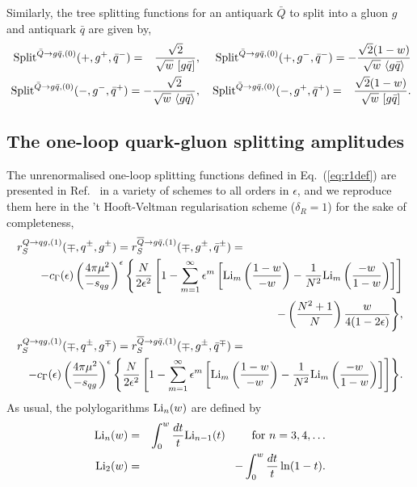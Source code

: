 \documentclass[paper,notoc,nohyper]{JHEP3}
\def\e{\epsilon}
\def\Split{\, {\rm Split}}
\def\WW{\frac{-w}{1-w}}
\def\OMWW{\frac{1-w}{-w}}
\def\Li{{\rm Li}}
\def\e{\epsilon}
\begin{document}
Similarly, the tree splitting functions for an antiquark $\bar Q$ to split into a
gluon $g$ and antiquark $\bar q$ are given by,
\begin{eqnarray}
\Split^{\bar Q \to g\bar q,(0)}(+,g^{+},\bar{q}^{-})=
\phantom{-}\frac{\sqrt{2}}{\sqrt{w}~[ g\bar q ]},
&&
\Split^{\bar Q \to g\bar q,(0)}(+,g^{-},\bar{q}^{-})=
-\frac{\sqrt{2}(1-w)}{\sqrt{w}~\langle g \bar q\rangle} 
\\
\Split^{\bar Q \to g\bar q,(0)}(-,g^{-},\bar{q}^{+})=
-\frac{\sqrt{2}}{\sqrt{w}~\langle g\bar q \rangle},
&&\Split^{\bar Q \to g\bar q,(0)}(-,g^{+},\bar{q}^{+})=
\phantom{-}\frac{\sqrt{2}(1-w)}{\sqrt{w}~[ g \bar q]}.
\end{eqnarray}

\subsection{The one-loop quark-gluon splitting amplitudes}

The unrenormalised one-loop splitting functions defined in Eq.~(\ref{eq:r1def}) 
are presented in Ref.~\cite{Bern:split1QCD} in  a variety of schemes
to all orders in $\e$, and we reproduce them here in the 't Hooft-Veltman regularisation scheme
($\delta_R = 1$) for the sake of completeness,
\begin{eqnarray}
\label{eq:qgone}
\lefteqn{r_{S}^{Q \to qg,(1)}(\mp,q^{\pm},g^{\pm})
=r_{S}^{\overline{Q} \to g\bar q,(1)}(\mp,g^{\pm},\bar{q}^{\pm})=}\nonumber \\
&&
-c_{\Gamma}(\e)\left(\frac{4\pi\mu^2}{-s_{qg}}\right)^{\epsilon}
\Biggl\{
\frac{N}{2\epsilon^2}\left[1
-\sum_{m=1}^{\infty} \e^m \left[ \Li_m\left(\OMWW\right)
-\frac{1}{N^2} \Li_m\left(\WW\right)\right]\right]\nonumber \\
&&\qquad\qquad\qquad -\left(\frac{N^2+1}{N}\right)
\frac{w}{4(1-2\e)}
\Biggr\},\\
\lefteqn{r_{S}^{Q \to qg,(1)}(\mp,q^{\pm},g^{\mp})=
r_{S}^{\overline{Q} \to g\bar q,(1)}(\mp,g^{\pm},\bar{q}^{\mp})=}\nonumber \\
&&
-c_{\Gamma}(\e)\left(\frac{4\pi\mu^2}{-s_{qg}}\right)^{\epsilon}
\Biggl\{
\frac{N}{2\epsilon^2}\left[1
-\sum_{m=1}^{\infty} \e^m \left[ \Li_m\left(\OMWW\right)
-\frac{1}{N^2} \Li_m\left(\WW\right)\right]\right]
\Biggr\}. 
\end{eqnarray}
As usual, the polylogarithms ${\rm Li}_n(w)$ are defined by
\begin{eqnarray}
 {\rm Li}_n(w) &=& \int_0^w \frac{dt}{t} {\rm Li}_{n-1}(t) \qquad {\rm ~for~}
 n=3,4,\ldots\nonumber \\
 {\rm Li}_2(w) &=& -\int_0^w \frac{dt}{t} \ln(1-t).
\label{eq:lidef}
\end{eqnarray} 
\end{document}
